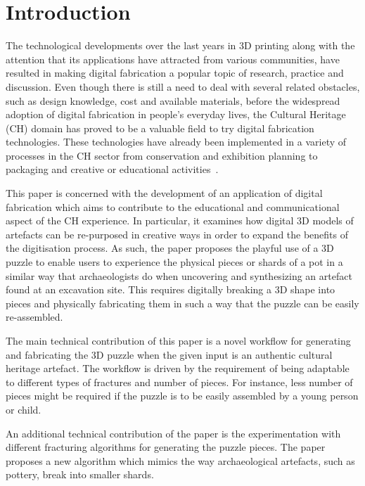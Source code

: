 \documentclass[acmlarge,screen,dvipsnames]{acmart}
\begin{document}
\section{Introduction}

The technological developments over the last years in 3D printing
along with the attention that its applications have attracted from
various communities, have resulted in making digital fabrication a
popular topic of research, practice and discussion. Even though there
is still a need to deal with several related obstacles, such as design
knowledge, cost and available materials, before the widespread
adoption of digital fabrication in people's everyday lives, the
Cultural Heritage (CH) domain has proved to be a valuable field to try
digital fabrication technologies. These technologies have already been
implemented in a variety of processes in the CH sector from
conservation and exhibition planning to packaging and creative or
educational
activities~\cite{Neely2013,Scopigno2014,Neumuller2014,Scopigno2015}.

This paper is concerned with the development of an application of
digital fabrication which aims to contribute to the educational and
communicational aspect of the CH experience. In particular, it
examines how digital 3D models of artefacts can be re-purposed in
creative ways in order to expand the benefits of the digitisation
process. As such, the paper proposes the playful use of a 3D puzzle to
enable users to experience the physical pieces or shards of a pot in a
similar way that archaeologists do when uncovering and synthesizing an
artefact found at an excavation site. This requires digitally breaking
a 3D shape into pieces and physically fabricating them in such a way
that the puzzle can be easily re-assembled.

The main technical contribution of this paper is a novel workflow for
generating and fabricating the 3D puzzle when the given input is an
authentic cultural heritage artefact. The workflow is driven by the
requirement of being adaptable to different types of fractures and
number of pieces. For instance, less number of pieces might be
required if the puzzle is to be easily assembled by a young person or
child.

An additional technical contribution of the paper is the
experimentation with different fracturing algorithms for generating
the puzzle pieces. The paper proposes a new algorithm which mimics the
way archaeological artefacts, such as pottery, break into smaller
shards.
\end{document}
